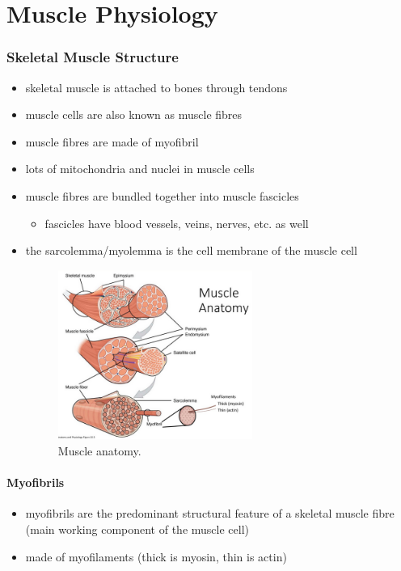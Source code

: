 \documentclass[10pt]{article}
\begin{document}
\part{Muscle Physiology}
\section{Skeletal Muscle Structure}
\begin{itemize}
    \item skeletal muscle is attached to bones through tendons
    \item muscle cells are also known as muscle fibres
    \item muscle fibres are made of myofibril
    \item lots of mitochondria and nuclei in muscle cells
    \item muscle fibres are bundled together into muscle fascicles
        \begin{itemize}
            \item fascicles have blood vessels, veins, nerves, etc. as well
        \end{itemize}
    \item the sarcolemma/myolemma is the cell membrane of the muscle cell
        \begin{figure}[h]
            \centering
            \includegraphics[width=0.6\textwidth]{muscleAnatomy}
            \caption{Muscle anatomy.}
            \label{fig:muscleAnatomy}
        \end{figure}
\end{itemize}

\subsection{Myofibrils}
\begin{itemize}
    \item myofibrils are the predominant structural feature of a skeletal muscle fibre (main working component of the muscle cell)
    \item made of myofilaments (thick is myosin, thin is actin)
\end{itemize}
\end{document}
